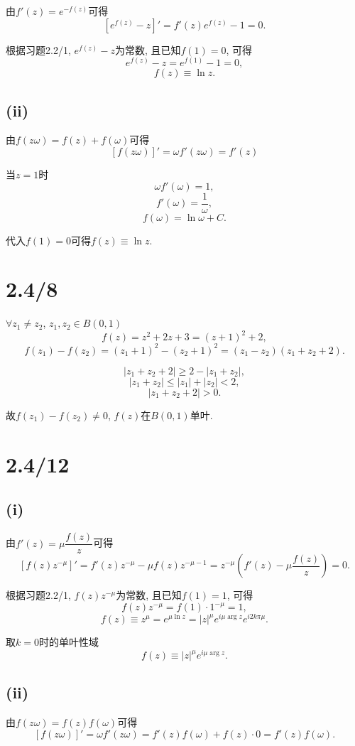 \documentclass[11pt,a4paper]{article}
\begin{document}
由$f'(z)=e^{-f(z)}$可得
$$[e^{f(z)}-z]'=f'(z)e^{f(z)}-1=0.$$

根据习题2.2/1, $e^{f(z)}-z$为常数, 且已知$f(1)=0$, 可得
$$e^{f(z)}-z=e^{f(1)}-1=0,$$
$$f(z)\equiv \ln z.$$

\subsection*{(ii)}
由$f(z\omega)=f(z)+f(\omega)$可得
$$[f(z\omega)]'=\omega f'(z\omega)=f'(z)$$

当$z=1$时
$$\omega f'(\omega)=1,$$
$$f'(\omega)=\frac{1}{\omega},$$
$$f(\omega)=\ln\omega + C.$$

代入$f(1)=0$可得$f(z)\equiv \ln z$.

\section{2.4/8}

$\forall z_1\neq z_2$, $z_1, z_2\in B(0,1)$
$$f(z)=z^2+2z+3=(z+1)^2+2,$$
$$f(z_1)-f(z_2)=(z_1+1)^2-(z_2+1)^2=(z_1-z_2)(z_1+z_2+2).$$

$$|z_1+z_2+2|\geqslant 2-|z_1+z_2|,$$
$$|z_1+z_2|\leqslant|z_1|+|z_2|<2,$$
$$|z_1+z_2+2|>0.$$

故$f(z_1)-f(z_2)\neq 0$, $f(z)$在$B(0,1)$单叶.

\section{2.4/12}

\subsection*{(i)}

由$f'(z)=\mu\dfrac{f(z)}{z}$可得
$$[f(z)z^{-\mu}]'=f'(z)z^{-\mu}-\mu f(z)z^{-\mu-1}=z^{-\mu}\left(f'(z)-\mu\frac{f(z)}{z}\right)=0.$$

根据习题2.2/1, $f(z)z^{-\mu}$为常数, 且已知$f(1)=1$, 可得
$$f(z)z^{-\mu}=f(1)\cdot 1^{-\mu}=1,$$
$$f(z)\equiv z^{\mu}=e^{\mu\ln z}=|z|^\mu e^{i\mu\arg z}e^{i2k\pi\mu}.$$

取$k=0$时的单叶性域
$$f(z)\equiv |z|^\mu e^{i\mu\arg z}.$$

\subsection*{(ii)}

由$f(z\omega)=f(z)f(\omega)$可得
$$[f(z\omega)]'=\omega f'(z\omega)=f'(z)f(\omega)+f(z)\cdot0=f'(z)f(\omega).$$
\end{document}
